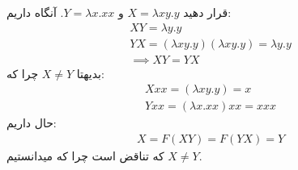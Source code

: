 قرار دهید $X = \lambda xy. y$ و $Y = \lambda x. xx$. آنگاه داریم:
\begin{gather*}
    XY = \lambda y. y \\
    YX = (\lambda xy. y) (\lambda xy. y) = \lambda y. y\\
    \implies XY = YX
\end{gather*}
بدیهتا $X \ne Y$ چرا که:
\begin{gather*}
    Xxx = (\lambda xy. y) = x \\
    Yxx = (\lambda x. xx) xx = xxx
\end{gather*}
حال داریم:
\begin{gather*}
    X = F(XY) = F(YX) = Y
\end{gather*}
که تناقض است چرا که میدانستیم $X \ne Y$.